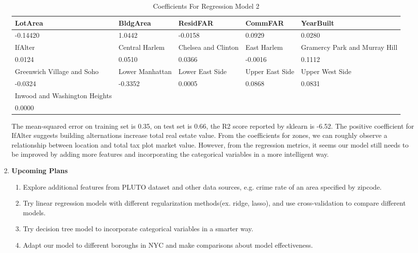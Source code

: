 \documentclass[11pt]{article}
\begin{document}
\begin{enumerate}
\begin{table}[H]
\centering
\caption{Coefficients For Regression Model 2}
\label{my-label}
\begin{tabular}{|p{2cm}|p{2cm}|p{2cm}|p{2cm}|p{2cm}|}
\hline
LotArea & BldgArea & ResidFAR & CommFAR & YearBuilt \\ 
\hline
-0.14420& 1.0442& -0.0158&  0.0929&  0.0280 \\
\hline
IfAlter & Central Harlem & Chelsea and Clinton & East Harlem & Gramercy Park and Murray Hill\\
\hline
0.0124& 0.0510& 0.0366& -0.0016&  0.1112\\
\hline
Greenwich Village and Soho & Lower Manhattan & Lower East Side & Upper East Side & Upper West Side\\
\hline
-0.0324& -0.3352& 0.0005&  0.0868& 0.0831\\
\hline
Inwood and Washington Heights & & & &\\
\hline
0.0000 & & & &\\
\hline
\end{tabular}
\end{table}
The mean-squared error on training set is 0.35, on test set is 0.66, the R2 score reported by sklearn is -6.52. The positive coefficient for IfAlter suggests building alternations increase total real estate value. From the coefficients for zones, we can roughly observe a relationship between location and total tax plot market value. However, from the regression metrics, it seems our model still needs to be improved by adding more features and incorporating the categorical variables in a more intelligent way.

\item
\textbf{Upcoming Plans}
\begin{enumerate}
\item Explore additional features from PLUTO dataset and other data sources, e.g. crime rate of an area specified by zipcode.
\item Try linear regression models with different regularization methods(ex. ridge, lasso), and use cross-validation to compare different models.
\item Try decision tree model to incorporate categorical variables in a smarter way.
\item Adapt our model to different boroughs in NYC and make comparisons about model effectiveness.
\end{enumerate}

\end{enumerate}
\end{document}
